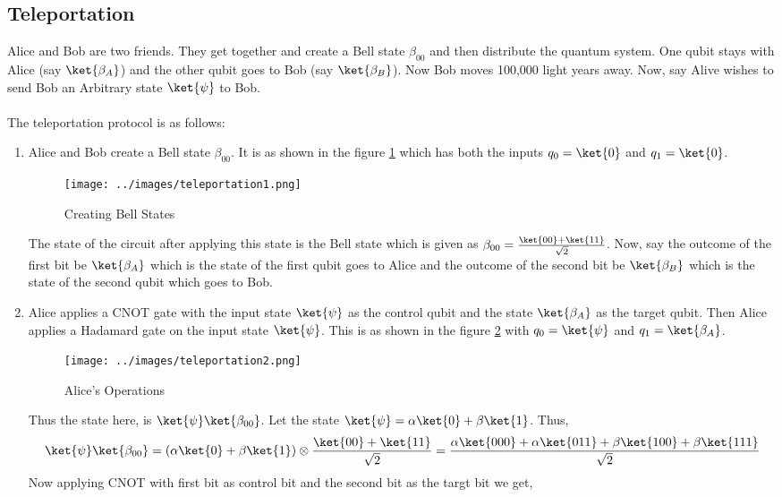 \documentclass[12pt, oneside]{book}
\theoremstyle{definition}
\theoremstyle{definition}
\theoremstyle{remark}
\begin{document}
\subsection{Teleportation}
Alice and Bob are two friends. 
They get together and create a Bell state $\beta_{00}$ and then 
distribute the quantum system. One qubit stays with Alice (say $\ket{\beta_A}$) 
and the other qubit goes to Bob (say $\ket{\beta_B}$).
Now Bob moves 100,000 light years away. Now, say Alive wishes to send Bob an Arbitrary state $\ket{\psi}$ to Bob.\\
\\
The teleportation protocol is as follows:
\begin{enumerate}
    \item Alice and Bob create a Bell state $\beta_{00}$. It is as shown in the figure \ref{fig:teleportation1} which has both the inputs $q_0=\ket{0}$ and $q_1=\ket{0}$.
    \begin{figure}[H]
        \centering
        \texttt{[image: ../images/teleportation1.png]}
        \caption{Creating Bell States}
        \label{fig:teleportation1}
    \end{figure}
    The state of the circuit after applying this state is the Bell state which is given as $\beta_{00}=\frac{\ket{00}+\ket{11}}{\sqrt{2}}$.
    Now, say the outcome of the first bit be $\ket{\beta_A}$ which is the state of the first qubit goes to Alice and the outcome of the second bit be $\ket{\beta_B}$ which is the state of the second qubit which goes to Bob.
    \item Alice applies a CNOT gate with the input state $\ket{\psi}$ as the control qubit and the state $\ket{\beta_A}$ as the target qubit. Then Alice applies a Hadamard gate on the input state $\ket{\psi}$. This is as shown in the figure \ref{fig:teleportation2} with $q_0=\ket{\psi}$ and $q_1=\ket{\beta_A}$.
    \begin{figure}[H]
        \centering
        \texttt{[image: ../images/teleportation2.png]}
        \caption{Alice's Operations}
        \label{fig:teleportation2}
    \end{figure}
    Thus the state here, is $\ket{\psi}\ket{\beta_{00}}$. Let the state $\ket{\psi}=\alpha\ket{0}+\beta\ket{1}$.
    Thus, 
    \[
        \ket{\psi}\ket{\beta_{00}}=(\alpha\ket{0}+\beta\ket{1})\otimes \frac{\ket{00}+\ket{11}}{\sqrt{2}}=\frac{\alpha\ket{000}+\alpha\ket{011}+\beta\ket{100}+\beta\ket{111}}{\sqrt{2}}
    \]
    Now applying CNOT with first bit as control bit and the second bit as the targt bit we get,

\end{enumerate}
\end{document}
